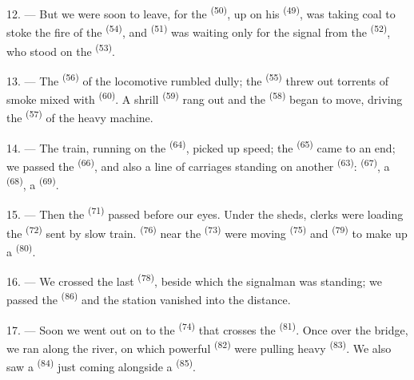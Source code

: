 12. --- But we were soon to leave, for the  \textsuperscript{(50)}, up
on his  \textsuperscript{(49)}, was taking coal to stoke the fire of the
 \textsuperscript{(54)}, and  \textsuperscript{(51)} was
waiting only for the signal from the 
\textsuperscript{(52)}, who stood on the  \textsuperscript{(53)}.

13. --- The  \textsuperscript{(56)} of the locomotive rumbled dully; the
 \textsuperscript{(55)} threw out torrents of smoke mixed with
 \textsuperscript{(60)}. A shrill  \textsuperscript{(59)} rang out
and the  \textsuperscript{(58)} began to move, driving the
 \textsuperscript{(57)} of the heavy machine.

\VUsaut{3.0mm}
\VUsaut{3.0mm}

14. --- The train, running on the  \textsuperscript{(64)}, picked up
speed; the  \textsuperscript{(65)} came to an end; we passed the
 \textsuperscript{(66)}, and also a line of carriages standing on
another  \textsuperscript{(63)}:  \textsuperscript{(67)}, a
 \textsuperscript{(68)}, a  \textsuperscript{(69)}.


15. --- Then the  \textsuperscript{(71)} passed before our eyes.
Under the sheds, clerks were loading the  \textsuperscript{(72)} sent by
slow train.  \textsuperscript{(76)} near the 
\textsuperscript{(73)} were moving  \textsuperscript{(75)} and
 \textsuperscript{(79)} to make up a 
\textsuperscript{(80)}.

16. --- We crossed the last  \textsuperscript{(78)}, beside which the
signalman was standing; we passed the  \textsuperscript{(86)} and the
station vanished into the distance.

17. --- Soon we went out on to the  \textsuperscript{(74)} that
crosses the  \textsuperscript{(81)}. Once over the bridge, we ran along
the river, on which powerful  \textsuperscript{(82)} were pulling heavy
 \textsuperscript{(83)}. We also saw a 
\textsuperscript{(84)} just coming alongside a  \textsuperscript{(85)}.

